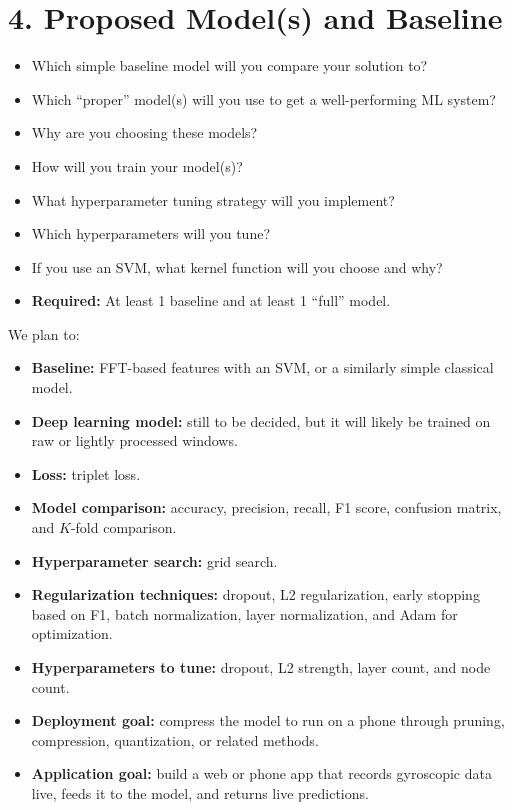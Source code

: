 \documentclass[11pt]{article}
\begin{document}
\section{4. Proposed Model(s) and Baseline}
\begin{itemize}
    \item Which simple baseline model will you compare your solution to?
    \item Which ``proper'' model(s) will you use to get a well-performing ML system?
    \item Why are you choosing these models?
    \item How will you train your model(s)?
    \item What hyperparameter tuning strategy will you implement?
    \item Which hyperparameters will you tune?
    \item If you use an SVM, what kernel function will you choose and why?
    \item \textbf{Required:} At least 1 baseline and at least 1 ``full'' model.
\end{itemize}

We plan to:
\begin{itemize}
    \item \textbf{Baseline:} FFT-based features with an SVM, or a similarly simple classical model.
    \item \textbf{Deep learning model:} still to be decided, but it will likely be trained on raw or lightly processed windows.
    \item \textbf{Loss:} triplet loss.
    \item \textbf{Model comparison:} accuracy, precision, recall, F1 score, confusion matrix, and $K$-fold comparison.
    \item \textbf{Hyperparameter search:} grid search.
    \item \textbf{Regularization techniques:} dropout, L2 regularization, early stopping based on F1, batch normalization, layer normalization, and Adam for optimization.
    \item \textbf{Hyperparameters to tune:} dropout, L2 strength, layer count, and node count.
    \item \textbf{Deployment goal:} compress the model to run on a phone through pruning, compression, quantization, or related methods.
    \item \textbf{Application goal:} build a web or phone app that records gyroscopic data live, feeds it to the model, and returns live predictions.
\end{itemize}
\end{document}
